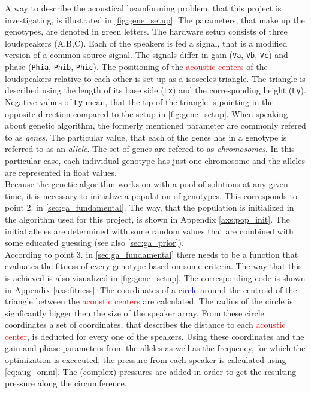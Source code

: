 A way to describe the acoustical beamforming problem, that this project is investigating, is illustrated in \autoref{fig:gene_setup}. The parameters, that make up the genotypes, are denoted in \textcolor{green3}{green} letters. The hardware setup consists of three loudspeakers (A,B,C). Each of the speakers is fed a signal, that is a modified version of a common source signal. The signals differ in gain (\textcolor{green3}{\texttt{Va}}, \textcolor{green3}{\texttt{Vb}}, \textcolor{green3}{\texttt{Vc}}) and phase (\textcolor{green3}{\texttt{Phia}}, \textcolor{green3}{\texttt{Phib}}, \textcolor{green3}{\texttt{Phic}}). The positioning of the \textcolor{red}{acoustic centers} of the loudspeakers relative to each other is set up as a isosceles triangle. The triangle is described using the length of its base side (\textcolor{green3}{\texttt{Lx}}) and the corresponding height (\textcolor{green3}{\texttt{Ly}}). Negative values of \textcolor{green3}{\texttt{Ly}} mean, that the tip of the triangle is pointing in the opposite direction compared to the setup in \autoref{fig:gene_setup}. When speaking about genetic algorithm, the formerly mentioned parameter are commonly refered to as \textit{genes}. The particular value, that each of the genes has in a genotype is referred to as an \textit{allele}. The set of genes are refered to as \textit{chromosomes}. In this particular case, each individual genotype has just one chromosome and the alleles are represented in float values.\\
Because the genetic algorithm works on with a pool of solutions at any given time, it is necessary to initialize a population of genotypes. This corresponds to point 2. in \autoref{sec:ga_fundamental}. The way, that the population is initialized in the algorithm used for this project, is shown in Appendix \ref{axs:pop_init}. The initial alleles are determined with some random values that are combined with some educated guessing (see also \autoref{sec:ga_prior}).\\
According to point  3. in \autoref{sec:ga_fundamental} there needs to be a function that evaluates the fitness of every genotype based on some criteria. The way that this is achieved is also visualized in \autoref{fig:gene_setup}. The corresponding code is shown in Appendix \ref{axs:fitness}. The coordinates of a \textcolor{blue}{circle} around the centroid of the triangle between the \textcolor{red}{acoustic centers} are calculated. The radius of the circle is signficantly bigger then the size of the speaker array. From these circle coordinates a set of coordinates, that describes the distance to each \textcolor{red}{acoustic center}, is deducted for every one of the speakers. Using these coordinates and the gain and phase parameters from the alleles as well as the frequency, for which the optimization is excecuted, the pressure from each speaker is calculated using \autoref{eq:aug_omni}. The (complex) pressures are added in order to get the resulting pressure along the circumference.\\
